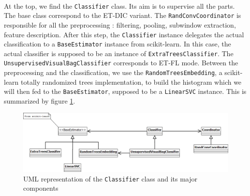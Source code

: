 \documentclass[a4paper]{report}
\begin{document}
		\paragraph{}
		At the top, we find the \texttt{Classifier} class. Its aim is to supervise all the parts. The base class correspond to the ET-DIC variant. The \texttt{RandConvCoordinator} is responsible for all the preprocessing : filtering, pooling, subwindow extraction, feature description. After this step, the \texttt{Classifier} instance delegates the actual classification to a \texttt{BaseEstimator} instance from scikit-learn. In this case, the actual classifier is supposed to be an instance of \texttt{ExtraTreesClassifier}. The \texttt{UnsupervisedVisualBagClassifier} corresponds to ET-FL mode. Between the preprocessing and the classification, we use the \texttt{RandomTreesEmbedding}, a scikit-learn totally randomized trees implementation, to build the histogram which we will then fed to the \texttt{BaseEstimator}, supposed to be a \texttt{LinearSVC} instance.
		This is summarized by figure \ref{fig:uml-classifier}.
		
		
		\begin{figure}
			\centering
				\includegraphics[width=1.00\textwidth]{images/uml-classifier.png}
			\caption{UML representation of the \texttt{Classifier} class and its major components}
			\label{fig:uml-classifier}
		\end{figure}
		
		
\end{document}
